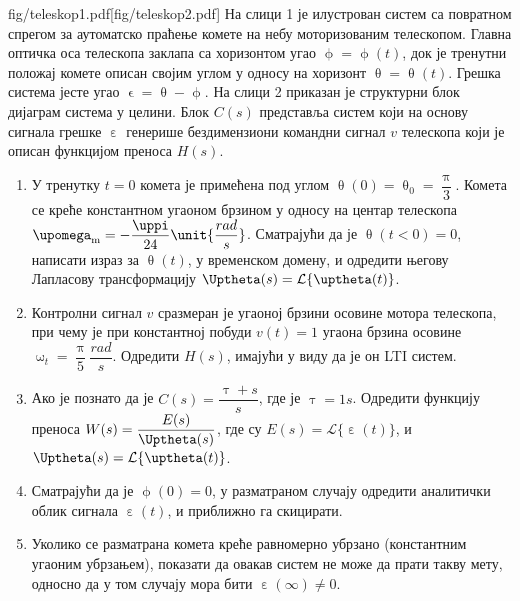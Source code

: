 \mnDifficult
\begin{slikaDesno}{fig/teleskop1.pdf}[fig/teleskop2.pdf]
\PID \label{z:teleskop}
На слици 1 је илустрован систем са повратном спрегом
за аутоматско праћење комете на небу моторизованим телескопом.
Главна оптичка оса телескопа заклапа са 
хоризонтом угао 
$\upphi = \upphi(t)$, док је тренутни положај 
комете описан својим углом у односу на хоризонт 
$\uptheta = \uptheta(t)$. Грешка система јесте 
угао $\upvarepsilon = \uptheta-\upphi$. На слици 
2 приказан је структурни блок дијаграм система 
у целини. Блок $C(s)$ представља систем 
који на основу сигнала грешке $\upepsilon$ 
генерише бездимензиони командни сигнал $v$ телескопа који је описан функцијом 
преноса $H(s)$. 

\begin{enumerate}[label=(\alph*)]
\item У тренутку $t = 0$ комета је примећена
под углом $\uptheta(0) = \uptheta_0 = \dfrac{\uppi}{3}$.
Комета се креће константном угаоном брзином у 
односу на центар телескопа 
${\upomega_{\rm m} = -\dfrac{\uppi}{24} \unit{\dfrac{rad}{s}}}$. \vspace*{1mm} 
Сматрајући да је $\uptheta(t<0) = 0$, 
написати израз за $\uptheta(t)$, у временском домену,
и одредити његову Лапласову трансформацију 
$\Uptheta(s) = \mathcal{L}\{\uptheta(t)\}$.
\end{enumerate}
\end{slikaDesno}

\begin{enumerate}[label=(\alph*)] \setcounter{enumi}{1}
\item Контролни сигнал $v$ сразмеран је
угаоној брзини осовине мотора телескопа, при 
чему је при константној побуди 
$v(t) = 1$ угаона брзина осовине  
$\upomega_t = \dfrac{\uppi}{5} \unit{\dfrac{rad}{s}}$.
Одредити $H(s)$, имајући у 
виду да је он LTI 
систем.

\item Ако је познато да је 
$C(s) = \dfrac{\uptau + s}{s} $, где је 
$\uptau = 1\unit{s}$.\vspace*{1mm}
Одредити функцију преноса 
$W(s) = \dfrac{E(s)}{\Uptheta(s)}$, где су
$E(s) = \mathcal{L}\{\upepsilon(t)\}$, и
$\Uptheta(s) = \mathcal{L}\{\uptheta(t)\}$.


\item
Сматрајући да је $\upphi(0) = 0$, 
у разматраном случају одредити 
аналитички облик сигнала $\upepsilon(t)$, и
приближно га скицирати.
%
\item Уколико се разматрана комета креће 
равномерно убрзано (константним угаоним убрзањем), 
показати да овакав систем не може да прати такву мету,
односно да у том случају мора бити $\upepsilon(\infty) \neq 0$.
\end{enumerate}

